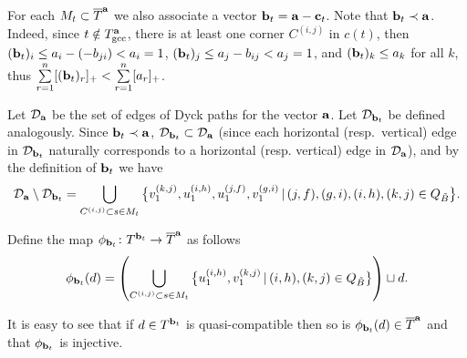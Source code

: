 \documentclass[pdftex]{sigma}
\numberwithin{equation}{section}
\begin{document}
For each $M_t \subset \overline{T}^{\bf a}$ we also associate a vector ${\bf b}_t={\bf a}-{\bf c}_t$. Note that ${\bf b}_t \prec {\bf a}$. Indeed, since $t\notin T^{\bf a}_{\rm gcc}$, there is at least one corner $C^{(i,j)}$ in $c(t)$,
then $({\bf b}_t)_i\le a_i-(-b_{ji})<a_i=1$, $({\bf b}_t)_j\le a_j-b_{ij}<a_j=1$, and
 $({\bf b}_t)_k\le a_k$ for all $k$, thus $\sum\limits_{r=1}^n [({\bf b}_t)_r]_+ < \sum\limits_{r=1}^n [a_r]_+$.

Let $\mathcal{D}_{\bf a}$ be the set of edges of Dyck paths for the vector ${\bf a}$. Let $\mathcal{D}_{{\bf b}_t}$ be def\/ined analogously. Since ${\bf b}_t \prec {\bf a}$, $\mathcal{D}_{{\bf b}_t} \subset \mathcal{D}_{\bf a}$ (since each horizontal (resp.~vertical) edge in  $\mathcal{D}_{{\bf b}_t}$ naturally corresponds to  a horizontal (resp. vertical) edge in $\mathcal{D}_{\bf a}$), and by the def\/inition of ${\bf b}_t$ we have
\begin{gather*}
\mathcal{D}_{\bf a} \setminus \mathcal{D}_{{\bf b}_t} =  \bigcup_{C^{(i,j)}\subset s \in M_t}\big\{ v_1^{(k,j)},u_1^{(i,h)},u_1^{(j,f)},v_1^{(g,i)} \,|\, (j,f),(g,i),(i,h),(k,j) \in Q_{\tilde B} \big\}.
\end{gather*}

\begin{Definition} Def\/ine the map $\phi_{{\bf b}_t}\colon T^{{\bf b}_t} \rightarrow \overline{T}^{\bf a}$ as follows
\begin{gather*}
\phi_{{\bf b}_t}(d)= \left( \bigcup_{C^{(i,j)}\subset s \in M_t}\big\{u_1^{(i,h)}, v_1^{(k,j)} \,|\, (i,h),(k,j) \in Q_{\tilde B} \big\}\right) \sqcup d.
\end{gather*}
\end{Definition}

It is easy to see that if $d \in T^{{\bf b}_t}$ is quasi-compatible then so is $\phi_{{\bf b}_t}(d) \in \overline{T}^{\bf a}$ and that $\phi_{{\bf b}_t}$ is injective.
\end{document}
